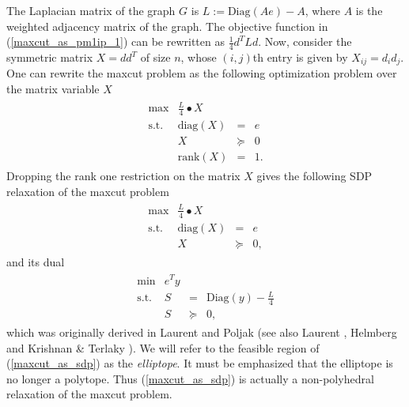 \documentclass[12pt]{article}
\begin{document}
The Laplacian matrix of the graph $G$ is $L := \mbox{Diag}(Ae) -
A$, where $A$ is the weighted adjacency matrix of the graph. The
objective function in (\ref{maxcut_as_pm1ip_1}) can be rewritten
as $\frac{1}{4} d^TLd$. Now, consider the symmetric matrix $X =
dd^T$ of size $n$, whose $(i,j)$th entry is given by $X_{ij} =
d_id_j$. One can rewrite the maxcut problem as the following
optimization problem over the matrix variable $X$
\begin{eqnarray}
\label{maxcut_as_rank1sdp}
\begin{array}{lrcc}
\max & \frac{L}{4} \bullet X \\
\mbox{s.t.} & \mbox{diag}(X) & = & e \\
& X & \succeq & 0 \\
& \mbox{rank}(X) & = & 1.
\end{array}
\end{eqnarray}
Dropping the rank one restriction on the matrix $X$ gives the
following SDP relaxation of the maxcut problem
\begin{eqnarray}
\label{maxcut_as_sdp}
\begin{array}{lrcc}
\max & \frac{L}{4} \bullet X \\
\mbox{s.t.} & \mbox{diag}(X) & = & e \\
& X & \succeq & 0,
\end{array}
\end{eqnarray}
and its dual
\begin{eqnarray}
\label{maxcut_as_sdd}
\begin{array}{lrcc}
\min & e^Ty \\
\mbox{s.t.} & S & = & \mbox{Diag}(y) - \frac{L}{4} \\
& S & \succeq & 0,
\end{array}
\end{eqnarray}
which was originally derived in Laurent and Poljak
\cite{laurent_poljak} (see also Laurent \cite{laurent_maxcut},
Helmberg \cite{helmberg8} and Krishnan \& Terlaky
\cite{krishnan_terlaky}). We will refer to the feasible region of
(\ref{maxcut_as_sdp}) as the {\em elliptope}. It must be
emphasized that the elliptope is no longer a polytope. Thus
(\ref{maxcut_as_sdp}) is actually a non-polyhedral relaxation of
the maxcut problem.
\end{document}
